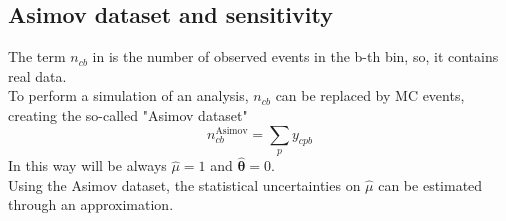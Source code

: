\subsection{Asimov dataset and sensitivity} The term $n_{cb}$ in  is the number of observed events in the b-th bin, so, it contains real data.\\
To perform a simulation of an analysis, $n_{cb}$ can be replaced by MC events, creating the so-called "Asimov dataset" \cite{Cowan2011AsymptoticPhysics}
\begin{equation}
    n_{cb}^{\text{Asimov}}=\sum_p y_{cpb}
\end{equation}
In this way will be always $\hat{\mu}=1$ and $\bm{\hat{\theta}}=0$.\\
Using the Asimov dataset, the statistical uncertainties on $\hat{\mu}$ can be estimated through an approximation.

